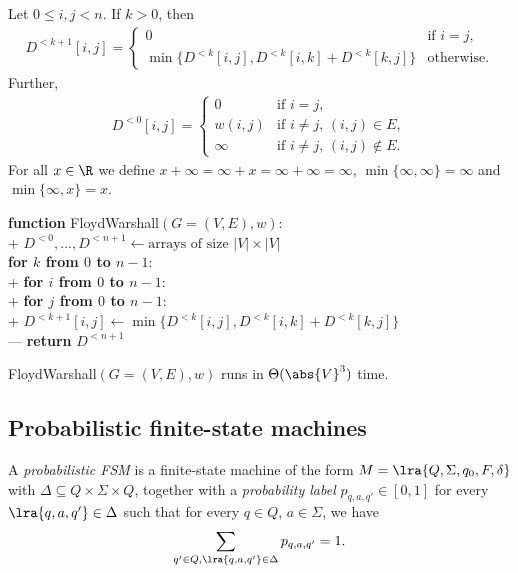 \documentclass{article}
\begin{document}
\begin{theorem}[L18]
	Let $0\leq i,j<n$. If $k>0$, then 
	\begin{align*}
		D^{<k+1}[i,j]=\begin{cases}
			0 & \text{if $i=j$}, \\
			\min\{D^{<k}[i,j],D^{<k}[i,k]+D^{<k}[k,j]\} & \text{otherwise}.
		\end{cases}
	\end{align*}
	Further,
	\begin{align*}
		D^{<0}[i,j] = \begin{cases}
			0 		& \text{if $i=j$}, \\
			w(i,j)  & \text{if $i\not=j$, $(i,j)\in E$}, \\
			\infty  & \text{if $i\not=j$, $(i,j)\not\in E$}.
		\end{cases}
	\end{align*}
	For all $x\in\R$ we define $x+\infty = \infty + x = \infty + \infty = \infty$,
	$\min\{\infty, \infty\}=\infty$ and $\min\{\infty, x\}=x$.
\end{theorem}

\begin{pseudo}
\textbf{function} \textsf{FloydWarshall}$(G=(V,E), w)$:\\+
	$D^{<0}, ..., D^{<n+1}\leftarrow \text{arrays of size $|V|\times |V|$}$	\\
	\textbf{for $k$ from $0$ to $n-1$}:										\\+
		\textbf{for $i$ from $0$ to $n-1$}:									\\+
			\textbf{for $j$ from $0$ to $n-1$}: 							\\+
				$D^{<k+1}[i,j]\leftarrow \min
					\{D^{<k}[i,j],D^{<k}[i,k]+D^{<k}[k,j]\}$				\\---
	\textbf{return} $D^{<n+1}$
\end{pseudo}

\begin{theorem}
	\textsf{FloydWarshall}$(G=(V,E), w)$ runs in $\Theta(\abs{V}^3)$ time.
\end{theorem}

\subsection{Probabilistic finite-state machines}

\begin{definition}[L19]
	A \emph{probabilistic FSM} is a finite-state machine of the form
	$M=\lra{Q, \Sigma, q_0, F, \delta}$ with $\Delta\subseteq Q\times\Sigma\times Q$,
	together with a \emph{probability label} $p_{q,a,q'}\in[0,1]$ for every
	$\lra{q,a,q'}\in\Delta$ such that for every $q\in Q$, $a\in\Sigma$, we have
	\begin{align*}
		\sum_{q'\in Q, \lra{q,a,q'}\in\Delta} p_{q,a,q'}=1.
	\end{align*}
\end{definition}
\end{document}

